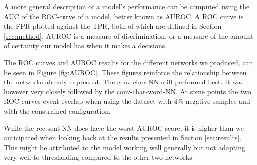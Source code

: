 A more general description of a model's performance can be computed using the
\gls{AUC} of the \gls{ROC}-curve of a model, better known as \gls{AUROC}.
A \gls{ROC} curve is the \gls{FPR} plotted against the \gls{TPR}, both of
which are defined in Section \ref{sec:method}. \gls{AUROC} is a measure of
discrimination, or a measure of the amount of certainty our model has when it
makes a decisions.

The ROC curves and AUROC results for the different networks we produced, can be
seen in Figure \ref{fig:AUROC}. These figures reinforce the relationship between
the networks already expressed. The \gls{conv-char-NN} still performed best.
It was however very closely followed by the \gls{conv-char-word-NN}. At some
points the two \gls{ROC}-curves event overlap when using the dataset with 4\%
negative samples and with the constrained configuration. 

While the \gls{rec-sent-NN} does have the worst AUROC score, it is higher
than we anticipated when looking back at the results presented in Section
\ref{sec:results}. This might be attributed to the model working well generally
but not adapting very well to thresholding compared to the other two networks.

